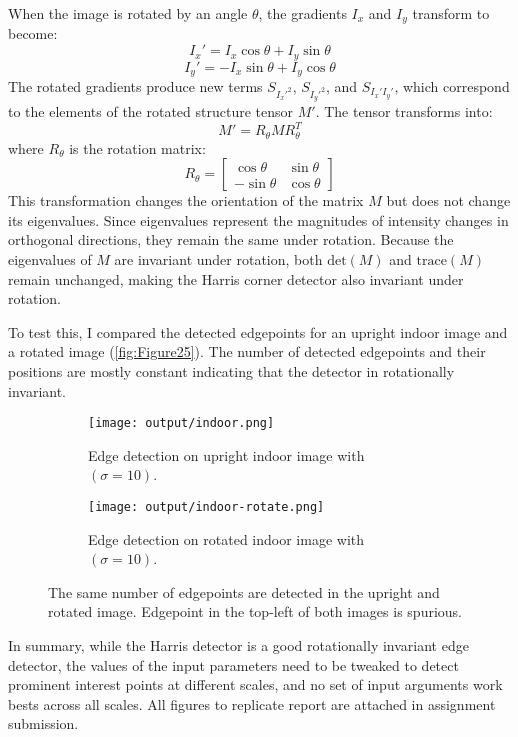 \documentclass[12pt]{report}
\begin{document}
\begin{enumerate}
    When the image is rotated by an angle \( \theta \), the gradients \( I_x \) and \( I_y \) transform to become:
    \[
    I_x' = I_x \cos \theta + I_y \sin \theta
    \]
    \[
    I_y' = -I_x \sin \theta + I_y \cos \theta
    \]
    The rotated gradients produce new terms \( S_{I_x'^2} \), \( S_{I_y'^2} \), and \( S_{I_x' I_y'} \), which correspond to the elements of the rotated structure 
    tensor \( M' \). The tensor transforms into:
    \[
    M' = R_\theta M R_\theta^T
    \]
    where \( R_\theta \) is the rotation matrix:
    \[
    R_\theta = \begin{bmatrix}
    \cos \theta & \sin \theta \\
    -\sin \theta & \cos \theta
    \end{bmatrix}
    \]
    This transformation changes the orientation of the matrix \( M \) but does not change its eigenvalues. Since eigenvalues represent the magnitudes of intensity changes 
    in orthogonal directions, they remain the same under rotation. Because the eigenvalues of \( M \) are invariant under rotation, both \( \text{det}(M) \) and 
    \(\text{trace}(M)\) remain unchanged, making the Harris corner detector also invariant under rotation.  

    To test this, I compared the detected edgepoints for an upright indoor image and a rotated image 
    (\autoref{fig:Figure25}). The number of detected edgepoints and their positions are mostly constant indicating that the detector in rotationally invariant.

    \begin{figure}[!ht]\centering
        \hspace*{-0.8in}
        \begin{subfigure}{0.45\textwidth}
            \texttt{[image: output/indoor.png]}
            \caption{Edge detection on upright indoor image with $(\sigma=10)$.}
            \label{fig:Figure25a}
        \end{subfigure}
    \hfil
        \begin{subfigure}{0.45\textwidth}
        \texttt{[image: output/indoor-rotate.png]}
        \caption{Edge detection on rotated indoor image with $(\sigma=10)$.}
        \label{fig:Figure25b}
        \end{subfigure}
        \caption{The same number of edgepoints are detected in the upright and rotated image. Edgepoint in the top-left of both images is spurious.}
        \label{fig:Figure25}
    \end{figure}

    In summary, while the Harris detector is a good rotationally invariant edge detector, the values of the input parameters need to be tweaked to detect prominent 
    interest points at different scales, and no set of input arguments work bests across all scales. All figures to replicate report are attached in assignment submission.
\end{enumerate}
\end{document}
